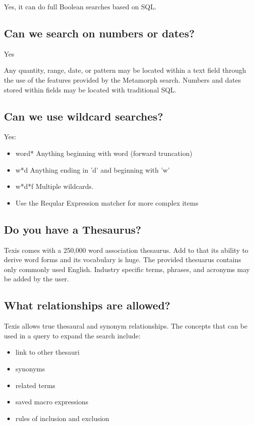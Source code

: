 Yes, it can do full Boolean searches based on SQL.

\subsection{Can we search on numbers or dates?}

Yes

Any quantity, range, date, or pattern may be located within a text field
through the use of the features provided by the Metamorph search.  Numbers
and dates stored within fields may be located with traditional SQL.

\subsection{Can we use wildcard searches?}

Yes:
\begin{itemize}
 \item        word* Anything beginning with word (forward truncation)
 \item        w*d Anything ending in 'd' and beginning with 'w'
 \item        w*d*f Multiple wildcards.
 \item        Use the Reqular Expression matcher for more complex items
\end{itemize}
\subsection{Do you have a Thesaurus?}

Texis comes with a 250,000 word association thesaurus.  Add to that its
ability to derive word forms and its vocabulary is huge.  The provided
thesuarus contains only commonly used English.  Industry specific terms,
phrases, and acronyms may be added by the user.

\subsection{What relationships are allowed?}

Texis allows true thesaural and synonym relationships. The concepts that can
be used in a query to expand the search include:
\begin{itemize}
 \item        link to other thesauri

 \item        synonyms

 \item        related terms

 \item        saved macro expressions

 \item        rules of inclusion and exclusion
\end{itemize}
